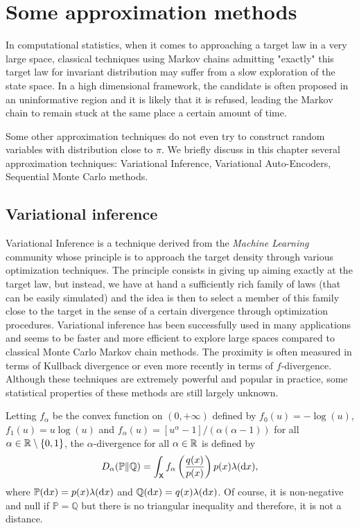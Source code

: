 \documentclass[english,graybox,envcountchap,envcountsame,sectrefs,shortlabels]{svmono}
\theoremstyle{style}
\begin{document}
\section{Some approximation methods}
In computational statistics, when it comes to approaching a target law in a very large space,
classical techniques using Markov chains admitting "exactly" this target law
for invariant distribution may suffer from a slow exploration of the state space. In a high dimensional framework, the candidate is often proposed in an uninformative region and it is likely that it is refused, leading the Markov chain to remain stuck at the same place a certain amount of time.

Some other approximation techniques do not even try to construct random variables with distribution close to $\pi$. We briefly discuss in this chapter several approximation techniques: Variational Inference, Variational Auto-Encoders, Sequential Monte Carlo methods.

\subsection{Variational inference}
Variational Inference is a technique derived from the
 {\em Machine Learning} community whose principle is to approach the target density through various optimization techniques. The principle consists in giving up aiming exactly at the target law, but instead, we have at hand a sufficiently rich family of laws (that can be easily simulated) and the idea is then to select a member of this family close to the target in the sense of a certain divergence through optimization procedures. Variational inference has been successfully used in many applications and seems to be faster and more efficient to explore large spaces compared to classical Monte Carlo Markov chain methods. The proximity is often measured in terms of Kullback divergence or even more recently in terms of $f$-divergence. Although these techniques are extremely powerful and popular in practice, some statistical properties of these methods are still largely unknown.

Letting $f_\alpha$ be the convex function on $(0, +\infty)$ defined by $f_0(u) = -\log(u)$, $f_1(u) = u\log(u)$ and $f_\alpha(u) = [  u^\alpha -1 ]/(\alpha(\alpha-1))$ for all $\alpha \in \mathbb{R} \setminus \left\{ 0,1\right\}$, the $\alpha$-divergence for all $\alpha \in \mathbb{R}$ is defined by
\begin{align}\label{eq:gen:div}
D_\alpha(\mathbb{P}\|\mathbb{Q}) = \int_{\mathsf{X}} f_\alpha\left(\frac{q(x)}{p(x)} \right)p(x) \lambda(\mathrm{d} x), 
\end{align}
where $\mathbb{P}(\mathrm{d} x)=p(x)\lambda(\mathrm{d} x)$ and $\mathbb{Q}(\mathrm{d} x)=q(x) \lambda(\mathrm{d} x)$. Of course, it is non-negative and null if $\mathbb{P}=\mathbb{Q}$ but there is no triangular inequality and therefore, it is not a distance.
\end{document}
